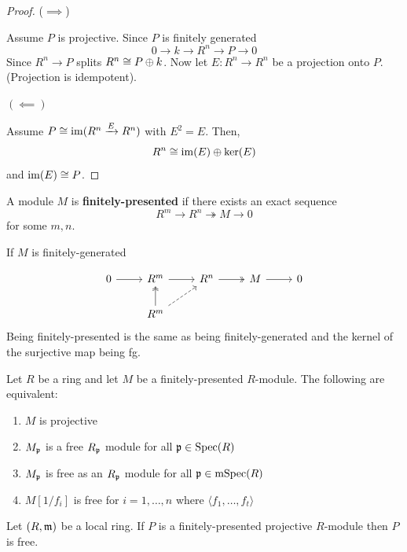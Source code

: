 \documentclass[12pt]{amsart}
\begin{document}
\begin{proof}
    ($\implies$) 

    Assume $P$ is projective. Since $P$ is finitely generated 
    \[0 \to k \to R^n \to P \to 0\]
    Since $R^n \to P$ splits $R^n \cong P \oplus k$. Now let $E: R^n \to R^n$ be a projection onto $P$. (Projection is idempotent). 

    $(\impliedby)$

    Assume $P \cong \operatorname{im}(R^n \xrightarrow{E} R^n)$ with $E^2 = E$. Then, 
    \[R^n \cong \operatorname{im}(E) \oplus \ker(E)\]
    and $\operatorname{im}(E) \cong P$. 
\end{proof}

\begin{definition}
    A module $M$ is \textbf{finitely-presented} if there exists an exact sequence 
    \[R^m \to R^n \twoheadrightarrow M \to 0\]
    for some $m, n$.
\end{definition}

\begin{remark}
    If $M$ is finitely-generated

    \[\begin{tikzcd}
    0 \ar[r] & R^m \arrow[r] & R^n \arrow[r, two heads] & M \arrow[r] & 0 \\ 
    {} & R^m \ar[u, two heads] \ar[ur, dashed]
    \end{tikzcd}\]
    Being finitely-presented is the same as being finitely-generated and the kernel of the surjective map being fg. \todo{}
\end{remark}

\begin{theorem}
Let \(R\) be a ring and let \(M\) be a finitely-presented \(R\)-module. The following are equivalent:
\begin{enumerate}
    \item \(M\) is projective
    \item \(M_{\operatorname{\mathfrak{p}}}\) is a free \(R_{\operatorname{\mathfrak{p}}}\) module for all \({\operatorname{\mathfrak{p}}} \in \operatorname{Spec}(R)\)
    \item \(M_{\operatorname{\mathfrak{p}}}\) is free as an \(R_{\operatorname{\mathfrak{p}}}\) module for all \({\operatorname{\mathfrak{p}}} \in \operatorname{mSpec}(R)\)
    \item \(M[1/f_i]\) is free for \(i = 1, \ldots, n\) where \(\langle{f_1, \ldots, f_t}\rangle\)
\end{enumerate}
\end{theorem}

\begin{theorem}
    Let $(R, \operatorname{\mathfrak{m}})$ be a local ring. If $P$ is a finitely-presented projective $R$-module then $P$ is free. 
\end{theorem}
\end{document}
